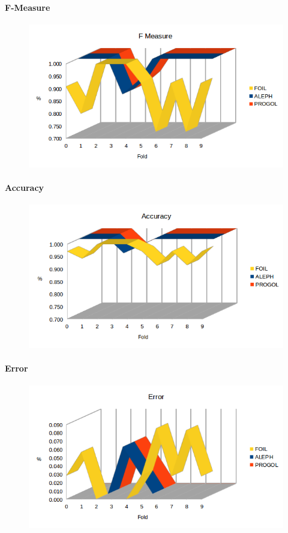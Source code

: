 \paragraph{F-Measure}
\begin{figure}[h!tbp]
	\includegraphics[width=1.2\textwidth]{img/datasetGraph/elsevier/fm.png}
	\label{Elsevier-F-measure}
\end{figure}
\paragraph{Accuracy}
\begin{figure}[h!tbp]
\includegraphics[width=1.2\textwidth]{img/datasetGraph/elsevier/accuracy.png}
\label{Elsevier-Accuracy}
\end{figure}
\paragraph{Error}
\begin{figure}[h!tbp]
	\includegraphics[width=1.2\textwidth]{img/datasetGraph/elsevier/error.png}
	\label{Elsevier-Error}
\end{figure}

